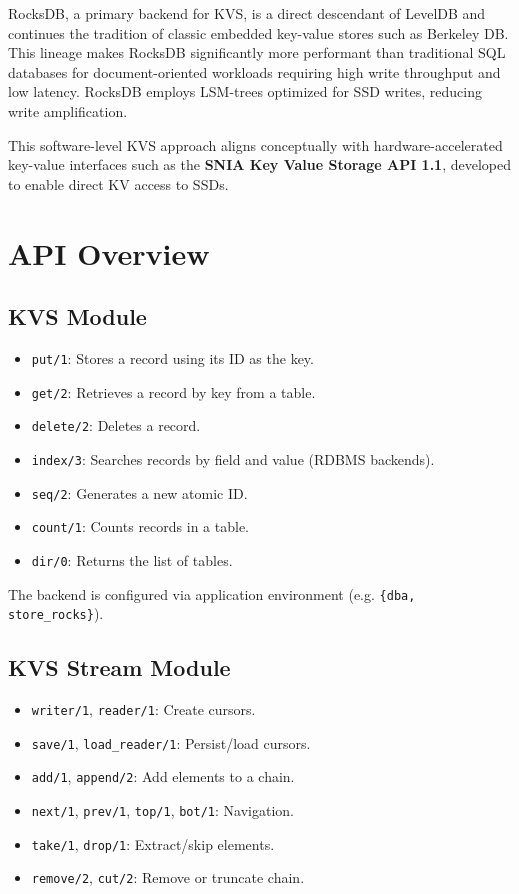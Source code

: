 \documentclass[11pt,a4paper]{article}
\begin{document}
RocksDB, a primary backend for KVS, is a direct descendant of LevelDB and continues the tradition of classic embedded key-value stores such as Berkeley DB. This lineage makes RocksDB significantly more performant than traditional SQL databases for document-oriented workloads requiring high write throughput and low latency. RocksDB employs LSM-trees optimized for SSD writes, reducing write amplification.

This software-level KVS approach aligns conceptually with hardware-accelerated key-value interfaces such as the \textbf{SNIA Key Value Storage API 1.1}, developed to enable direct KV access to SSDs.

\section{API Overview}

\subsection{KVS Module}

\begin{itemize}
    \item \texttt{put/1}: Stores a record using its ID as the key.
    \item \texttt{get/2}: Retrieves a record by key from a table.
    \item \texttt{delete/2}: Deletes a record.
    \item \texttt{index/3}: Searches records by field and value (RDBMS backends).
    \item \texttt{seq/2}: Generates a new atomic ID.
    \item \texttt{count/1}: Counts records in a table.
    \item \texttt{dir/0}: Returns the list of tables.
\end{itemize}

The backend is configured via application environment (e.g. \texttt{\{dba, store\_rocks\}}).

\subsection{KVS Stream Module}

\begin{itemize}
    \item \texttt{writer/1}, \texttt{reader/1}: Create cursors.
    \item \texttt{save/1}, \texttt{load\_reader/1}: Persist/load cursors.
    \item \texttt{add/1}, \texttt{append/2}: Add elements to a chain.
    \item \texttt{next/1}, \texttt{prev/1}, \texttt{top/1}, \texttt{bot/1}: Navigation.
    \item \texttt{take/1}, \texttt{drop/1}: Extract/skip elements.
    \item \texttt{remove/2}, \texttt{cut/2}: Remove or truncate chain.
\end{itemize}
\end{document}

